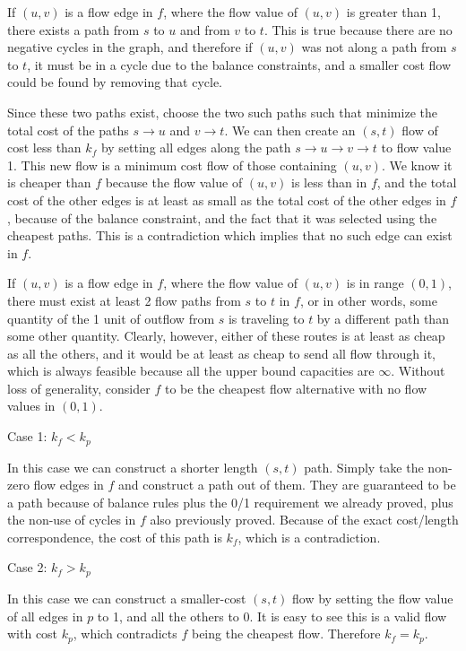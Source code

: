 \documentclass{article}
\begin{document}
If $(u,v)$ is a flow edge in $f$, where the flow value of $(u,v)$ is greater than 1,
there exists a path from $s$ to $u$ and from $v$ to $t$. This is true because
there are no negative cycles in the graph, and therefore if $(u,v)$ was not
along a path from $s$ to $t$, it must be in a cycle due to the balance
constraints, and a smaller cost flow could be found by removing that cycle.

Since these two paths exist, choose the two such paths such that minimize the
total cost of the paths $s \to u$ and $v \to t$. We can then create an $(s,t)$
flow of cost less than $k_f$ by setting all edges along the path $s \to u \to
v \to t$ to flow value 1. This new flow is a minimum cost flow of those containing
$(u,v)$. We know it is cheaper than $f$ because the flow value of $(u,v)$ is
less than in $f$, and the total cost of the other edges is at least as small
as the total cost of the other edges in $f$, because of the balance
constraint, and the fact that it was selected using the cheapest paths. This is a
contradiction which implies that no such edge can exist in $f$.

If $(u,v)$ is a flow edge in $f$, where the flow value of $(u,v)$ is in range
$(0,1)$, there must exist at least 2 flow paths from $s$ to $t$ in $f$, or in other
words, some quantity of the 1 unit of outflow from $s$ is traveling to $t$ by
a different path than some other quantity. Clearly, however, either of these
routes is at least as cheap as all the others, and it would be at least as cheap to send
all flow through it, which is always feasible because all the upper bound capacities
are $\infty$. Without loss of generality, consider $f$ to be the cheapest flow
alternative with no flow values in $(0,1)$.

Case 1: $k_f < k_p$

In this case we can construct a shorter length $(s,t)$ path. Simply take the
non-zero flow edges in $f$ and construct a path out of them. They are
guaranteed to be a path because of balance rules plus the 0/1 requirement
we already proved, plus the non-use of cycles in $f$ also previously proved.
Because of the exact cost/length correspondence, the cost of this path is
$k_f$, which is a contradiction.

Case 2: $k_f > k_p$

In this case we can construct a smaller-cost $(s,t)$ flow by setting the flow
value of all edges in $p$ to 1, and all the others to 0. It is easy to see
this is a valid flow with cost $k_p$, which contradicts $f$ being the cheapest
flow. Therefore $k_f = k_p$. 
\end{document}
